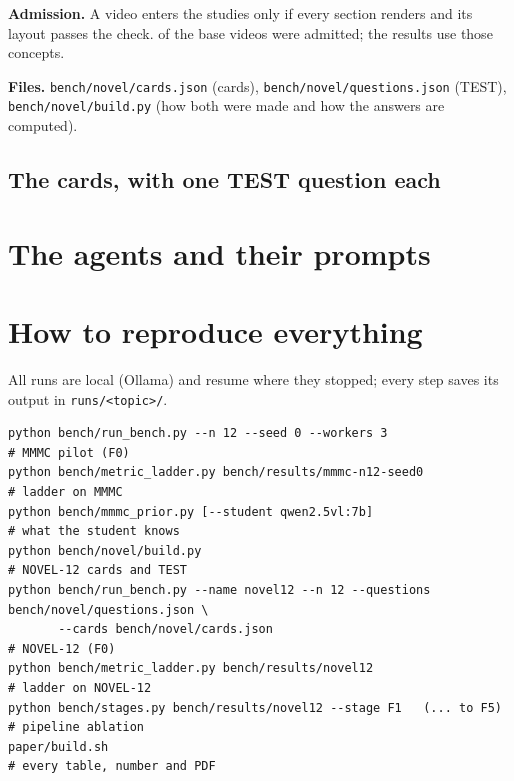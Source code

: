 \documentclass[11pt]{article}
\begin{document}
\textbf{Admission.} A video enters the studies only if every section renders and its layout passes the check.
\AdmComplete{} of the \AdmTotal{} base videos were admitted; the results use those concepts.

\textbf{Files.} \texttt{bench/novel/cards.json} (cards), \texttt{bench/novel/questions.json} (TEST),
\texttt{bench/novel/build.py} (how both were made and how the answers are computed).

\subsection*{The cards, with one TEST question each}


\section{The agents and their prompts}\label{app:prompts}


\section{How to reproduce everything}
All runs are local (Ollama) and resume where they stopped; every step saves its output in \texttt{runs/<topic>/}.
{\footnotesize
\begin{verbatim}
python bench/run_bench.py --n 12 --seed 0 --workers 3                      # MMMC pilot (F0)
python bench/metric_ladder.py bench/results/mmmc-n12-seed0                 # ladder on MMMC
python bench/mmmc_prior.py [--student qwen2.5vl:7b]                        # what the student knows
python bench/novel/build.py                                                # NOVEL-12 cards and TEST
python bench/run_bench.py --name novel12 --n 12 --questions bench/novel/questions.json \
       --cards bench/novel/cards.json                                      # NOVEL-12 (F0)
python bench/metric_ladder.py bench/results/novel12                        # ladder on NOVEL-12
python bench/stages.py bench/results/novel12 --stage F1   (... to F5)      # pipeline ablation
paper/build.sh                                                             # every table, number and PDF
\end{verbatim}}



\end{document}
